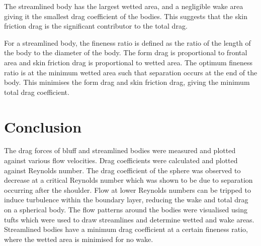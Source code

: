 \documentclass[8pt]{article}
\begin{document}
The streamlined body has the largest wetted area, and a negligible wake area giving it the smallest drag coefficient of the bodies. 
This suggests that the skin friction drag is the significant contributor to the total drag.


For a streamlined body, the fineness ratio is defined as the ratio of the length of the body to the diameter of the body.
The form drag is proportional to frontal area and skin friction drag is proportional to wetted area.
The optimum fineness ratio is at the minimum wetted area such that separation occurs at the end of the body.
This minimises the form drag and skin friction drag, giving the minimum total drag coefficient.

\section{Conclusion}

The drag forces of bluff and streamlined bodies were measured and plotted against various flow velocities.
Drag coefficients were calculated and plotted against Reynolds number.
The drag coefficient of the sphere was observed to decrease at a critical Reynolds number which was shown to be due to separation occurring after the shoulder.
Flow at lower Reynolds numbers can be tripped to induce turbulence within the boundary layer, reducing the wake and total drag on a spherical body.
The flow patterns around the bodies were visualised using tufts which were used to draw streamlines and determine wetted and wake areas.
Streamlined bodies have a minimum drag coefficient at a certain fineness ratio, where the wetted area is minimised for no wake.
\end{document}

